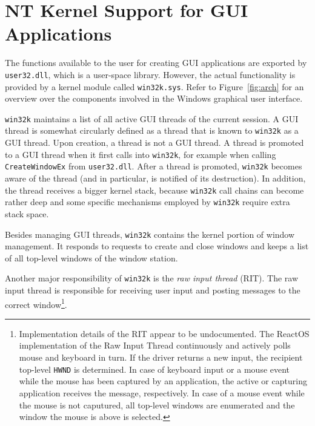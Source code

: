 	\section{NT Kernel Support for GUI Applications}\label{sec:win32k}
		The functions available to the user for creating GUI applications are
		exported by \texttt{user32.dll}, which is a user-space library.
		However, the actual functionality is provided by a kernel module called
		\texttt{win32k.sys}. Refer to Figure~\ref{fig:arch} for an overview over the
		components involved in the Windows graphical user interface. \cite{probertwin32k}

		\texttt{win32k} maintains a list of all active GUI threads of the
		current session. A GUI thread is somewhat circularly defined as a
		thread that is known to \texttt{win32k} as a GUI thread. Upon creation,
		a thread is not a GUI thread. A thread is promoted to a GUI thread when
		it first calls into \texttt{win32k}, for example when calling
		\texttt{CreateWindowEx} from \texttt{user32.dll}. After a thread is
		promoted, \texttt{win32k} becomes aware of the thread (and in
		particular, is notified of its destruction). In addition, the thread
		receives a bigger kernel stack, because \texttt{win32k} call chains
		can become rather deep and some specific mechanisms employed by \texttt{win32k}
		require extra stack space.
		\cite{probertwin32k,mandy2011kernel}

		Besides managing GUI threads, \texttt{win32k} contains the kernel portion
		of window management. It responds to requests to create and close windows
		and keeps a list of all top-level windows of the window station.
		\cite{probertwin32k,goingdeep}

		Another major responsibility of \texttt{win32k} is the \textit{raw input
		thread} (RIT). The raw input thread is responsible for receiving user input and posting
		messages to the correct window\footnote{Implementation details of the
		RIT appear to be undocumented. The ReactOS implementation of
		the Raw Input Thread continuously and actively polls mouse and keyboard
		in turn. If the driver returns a new input, the recipient top-level \texttt{HWND}
		is determined. In case of keyboard input or a mouse event while the mouse
		has been captured by an application, the active or capturing application
		receives the message, respectively. In case of a mouse event while the
		mouse is not caputured, all top-level windows are enumerated and the
		window the mouse is above is selected.}.
		\cite{probertwin32k}

